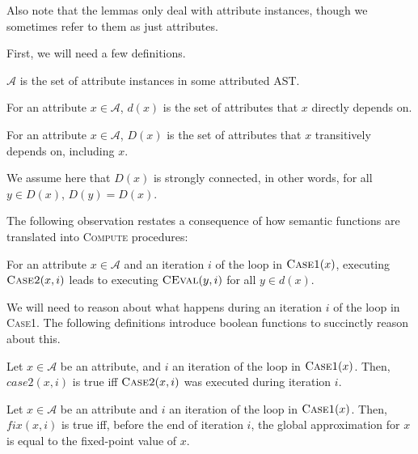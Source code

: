 {Also note that the lemmas only deal with attribute instances, though we sometimes
refer to them as just attributes.

First, we will need a few definitions.

\begin{definition}
  $\mathcal{A}$ is the set of attribute instances in some attributed AST.
\end{definition}

\begin{definition}
  For an attribute $x \in \mathcal{A}$, $d(x)$ is the set of attributes that $x$ directly
  depends on.
\end{definition}

\begin{definition}
  For an attribute $x \in \mathcal{A}$, $D(x)$ is the set of attributes that $x$ transitively
  depends on, including $x$.

  We assume here that $D(x)$ is strongly connected, in other words, for all
  $y \in D(x)$, $D(y) = D(x)$.
\end{definition}

The following observation restates a consequence of how semantic functions are translated into
\textsc{Compute} procedures:

\begin{observation}
  For an attribute $x \in \mathcal{A}$
  and an iteration $i$ of the loop in $\textsc{Case1}(x)$,
  executing $\textsc{Case2}(x, i)$ leads to executing $\textsc{CEval}(y, i)$ for all $y \in d(x)$.
  \label{obs:recursive_eval}
\end{observation}

We will need to reason about what happens during an iteration $i$
of the loop in \textsc{Case1}.  The following definitions introduce
boolean functions to succinctly reason about this.

\begin{definition}
  Let $x \in \mathcal{A}$ be an attribute,
  and $i$ an iteration of the loop in $\textsc{Case1}(x)$.
  Then, $\mathit{case2}(x, i)$ is true iff $\textsc{Case2}(x, i)$ was executed during iteration $i$.
\end{definition}

\begin{definition}
  Let $x \in \mathcal{A}$ be an attribute
  and $i$ an iteration of the loop in $\textsc{Case1}(x)$.
  Then, $\mathit{fix}(x, i)$ is true iff,
  before the end of iteration $i$,
  the global approximation for $x$ is equal to the fixed-point value of $x$.


\end{definition}}
